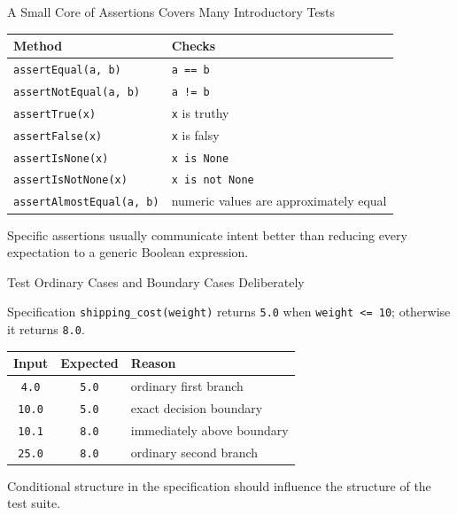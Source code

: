 \documentclass[aspectratio=169,10pt]{beamer}
\begin{document}
\begin{frame}{A Small Core of Assertions Covers Many Introductory Tests}
  \begin{center}
    \renewcommand{\arraystretch}{1.38}
    \begin{tabular}{l|l}
      \textbf{Method} & \textbf{Checks} \\\hline
      \texttt{assertEqual(a, b)} & \texttt{a == b} \\
      \texttt{assertNotEqual(a, b)} & \texttt{a != b} \\
      \texttt{assertTrue(x)} & \texttt{x} is truthy \\
      \texttt{assertFalse(x)} & \texttt{x} is falsy \\
      \texttt{assertIsNone(x)} & \texttt{x is None} \\
      \texttt{assertIsNotNone(x)} & \texttt{x is not None} \\
      \texttt{assertAlmostEqual(a, b)} & numeric values are approximately equal
    \end{tabular}
  \end{center}

  \begin{keyidea}
    Specific assertions usually communicate intent better than reducing every expectation to a generic Boolean expression.
  \end{keyidea}
\end{frame}


\begin{frame}{Test Ordinary Cases and Boundary Cases Deliberately}
  \begin{block}{Specification}
    \texttt{shipping\_cost(weight)} returns \texttt{5.0} when \texttt{weight <= 10}; otherwise it returns \texttt{8.0}.
  \end{block}

  \begin{center}
    \renewcommand{\arraystretch}{1.35}
    \begin{tabular}{c|c|l}
      \textbf{Input} & \textbf{Expected} & \textbf{Reason} \\\hline
      \texttt{4.0} & \texttt{5.0} & ordinary first branch \\
      \texttt{10.0} & \texttt{5.0} & exact decision boundary \\
      \texttt{10.1} & \texttt{8.0} & immediately above boundary \\
      \texttt{25.0} & \texttt{8.0} & ordinary second branch
    \end{tabular}
  \end{center}

  \begin{keyidea}
    Conditional structure in the specification should influence the structure of the test suite.
  \end{keyidea}
\end{frame}
\end{document}
